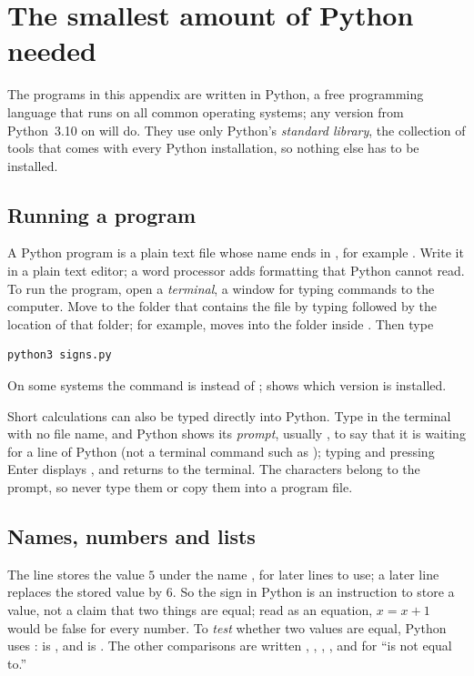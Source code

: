 \section{The smallest amount of Python needed}\label{appB:sec:python}
The programs in this appendix are written in Python, a free programming language that runs on all common operating systems; any version from Python~3.10 on will do. They use only Python's \emph{standard library}, the collection of tools that comes with every Python installation, so nothing else has to be installed.

\subsection*{Running a program}
A Python program is a plain text file whose name ends in , for example . Write it in a plain text editor; a word processor adds formatting that Python cannot read. To run the program, open a \emph{terminal}, a window for typing commands to the computer. Move to the folder that contains the file by typing  followed by the location of that folder; for example,  moves into the folder  inside . Then type
\par\noindent\begin{minipage}{\linewidth}
\begin{lstlisting}
python3 signs.py
\end{lstlisting}
\end{minipage}\par
On some systems the command is  instead of ;  shows which version is installed.

Short calculations can also be typed directly into Python. Type  in the terminal with no file name, and Python shows its \emph{prompt}, usually \code{>{}>{}>}, to say that it is waiting for a line of Python (not a terminal command such as ); typing  and pressing Enter displays , and  returns to the terminal. The characters \code{>{}>{}>} belong to the prompt, so never type them or copy them into a program file.

\subsection*{Names, numbers and lists}
The line  stores the value $5$ under the name , for later lines to use; a later line  replaces the stored value by $6$. So the sign \code{=} in Python is an instruction to store a value, not a claim that two things are equal; read as an equation, $x=x+1$ would be false for every number. To \emph{test} whether two values are equal, Python uses \code{==}:  is , and  is . The other comparisons are written \code{<}, \code{<=}, \code{>}, \code{>=}, and \code{!=} for ``is not equal to.''

